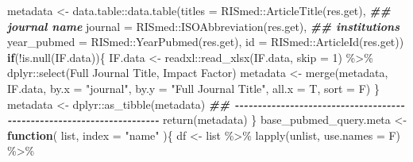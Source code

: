 \documentclass[
]{article}
\newenvironment{Shaded}{\begin{snugshade}}{\end{snugshade}}
\newcommand{\AttributeTok}[1]{\textcolor[rgb]{0.77,0.63,0.00}{#1}}
\newcommand{\ControlFlowTok}[1]{\textcolor[rgb]{0.13,0.29,0.53}{\textbf{#1}}}
\newcommand{\DecValTok}[1]{\textcolor[rgb]{0.00,0.00,0.81}{#1}}
\newcommand{\DocumentationTok}[1]{\textcolor[rgb]{0.56,0.35,0.01}{\textbf{\textit{#1}}}}
\newcommand{\FunctionTok}[1]{\textcolor[rgb]{0.00,0.00,0.00}{#1}}
\newcommand{\NormalTok}[1]{#1}
\newcommand{\OtherTok}[1]{\textcolor[rgb]{0.56,0.35,0.01}{#1}}
\newcommand{\SpecialCharTok}[1]{\textcolor[rgb]{0.00,0.00,0.00}{#1}}
\newcommand{\StringTok}[1]{\textcolor[rgb]{0.31,0.60,0.02}{#1}}
\begin{document}
\begin{Shaded}
\begin{Highlighting}[]
\NormalTok{    metadata }\OtherTok{\textless{}{-}}\NormalTok{ data.table}\SpecialCharTok{::}\FunctionTok{data.table}\NormalTok{(}\AttributeTok{titles =}\NormalTok{ RISmed}\SpecialCharTok{::}\FunctionTok{ArticleTitle}\NormalTok{(res.get),}
                                       \DocumentationTok{\#\# journal name}
                                       \AttributeTok{journal =}\NormalTok{ RISmed}\SpecialCharTok{::}\FunctionTok{ISOAbbreviation}\NormalTok{(res.get),}
                                       \DocumentationTok{\#\# institutions}
                                       \AttributeTok{year\_pubmed =}\NormalTok{ RISmed}\SpecialCharTok{::}\FunctionTok{YearPubmed}\NormalTok{(res.get),}
                                       \AttributeTok{id =}\NormalTok{ RISmed}\SpecialCharTok{::}\FunctionTok{ArticleId}\NormalTok{(res.get))}
    \ControlFlowTok{if}\NormalTok{(}\SpecialCharTok{!}\FunctionTok{is.null}\NormalTok{(IF.data))\{}
\NormalTok{      IF.data }\OtherTok{\textless{}{-}}\NormalTok{ readxl}\SpecialCharTok{::}\FunctionTok{read\_xlsx}\NormalTok{(IF.data, }\AttributeTok{skip =} \DecValTok{1}\NormalTok{) }\SpecialCharTok{\%\textgreater{}\%} 
\NormalTok{        dplyr}\SpecialCharTok{::}\FunctionTok{select}\NormalTok{(}\StringTok{\textasciigrave{}}\AttributeTok{Full Journal Title}\StringTok{\textasciigrave{}}\NormalTok{, }\StringTok{\textasciigrave{}}\AttributeTok{Impact Factor}\StringTok{\textasciigrave{}}\NormalTok{)}
\NormalTok{      metadata }\OtherTok{\textless{}{-}} \FunctionTok{merge}\NormalTok{(metadata, IF.data, }\AttributeTok{by.x =} \StringTok{"journal"}\NormalTok{, }\AttributeTok{by.y =} \StringTok{"Full Journal Title"}\NormalTok{,}
                        \AttributeTok{all.x =}\NormalTok{ T, }\AttributeTok{sort =}\NormalTok{ F)}
\NormalTok{    \}}
\NormalTok{    metadata }\OtherTok{\textless{}{-}}\NormalTok{ dplyr}\SpecialCharTok{::}\FunctionTok{as\_tibble}\NormalTok{(metadata)}
    \DocumentationTok{\#\# {-}{-}{-}{-}{-}{-}{-}{-}{-}{-}{-}{-}{-}{-}{-}{-}{-}{-}{-}{-}{-}{-}{-}{-}{-}{-}{-}{-}{-}{-}{-}{-}{-}{-}{-}{-}{-}{-}{-}{-}{-}{-}{-}{-}{-}{-}{-}{-}{-}{-}{-}{-}{-}{-}{-}{-}{-}{-}{-}{-}{-}{-}{-}{-}{-}{-}{-}{-}{-}{-} }
    \FunctionTok{return}\NormalTok{(metadata)}
\NormalTok{  \}}
\NormalTok{base\_pubmed\_query.meta }\OtherTok{\textless{}{-}} 
  \ControlFlowTok{function}\NormalTok{(}
\NormalTok{           list,}
           \AttributeTok{index =} \StringTok{"name"}
\NormalTok{           )\{}
\NormalTok{    df }\OtherTok{\textless{}{-}}\NormalTok{ list }\SpecialCharTok{\%\textgreater{}\%} 
      \FunctionTok{lapply}\NormalTok{(unlist, }\AttributeTok{use.names =}\NormalTok{ F) }\SpecialCharTok{\%\textgreater{}\%} 

\end{Highlighting}
\end{Shaded}
\end{document}
